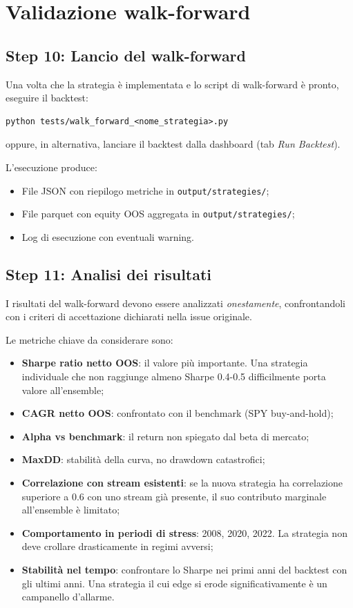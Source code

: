 \section{Validazione walk-forward}

\subsection{Step 10: Lancio del walk-forward}

Una volta che la strategia è implementata e lo script di walk-forward è pronto, eseguire il backtest:

\begin{lstlisting}
python tests/walk_forward_<nome_strategia>.py
\end{lstlisting}

oppure, in alternativa, lanciare il backtest dalla dashboard (tab \emph{Run Backtest}).

L'esecuzione produce:

\begin{itemize}
  \item File JSON con riepilogo metriche in \texttt{output/strategies/};
  \item File parquet con equity OOS aggregata in \texttt{output/strategies/};
  \item Log di esecuzione con eventuali warning.
\end{itemize}

\subsection{Step 11: Analisi dei risultati}

I risultati del walk-forward devono essere analizzati \emph{onestamente}, confrontandoli con i criteri di accettazione dichiarati nella issue originale.

Le metriche chiave da considerare sono:

\begin{itemize}
  \item \textbf{Sharpe ratio netto OOS}: il valore più importante. Una strategia individuale che non raggiunge almeno Sharpe 0.4-0.5 difficilmente porta valore all'ensemble;
  \item \textbf{CAGR netto OOS}: confrontato con il benchmark (SPY buy-and-hold);
  \item \textbf{Alpha vs benchmark}: il return non spiegato dal beta di mercato;
  \item \textbf{MaxDD}: stabilità della curva, no drawdown catastrofici;
  \item \textbf{Correlazione con stream esistenti}: se la nuova strategia ha correlazione superiore a 0.6 con uno stream già presente, il suo contributo marginale all'ensemble è limitato;
  \item \textbf{Comportamento in periodi di stress}: 2008, 2020, 2022. La strategia non deve crollare drasticamente in regimi avversi;
  \item \textbf{Stabilità nel tempo}: confrontare lo Sharpe nei primi anni del backtest con gli ultimi anni. Una strategia il cui edge si erode significativamente è un campanello d'allarme.
\end{itemize}

